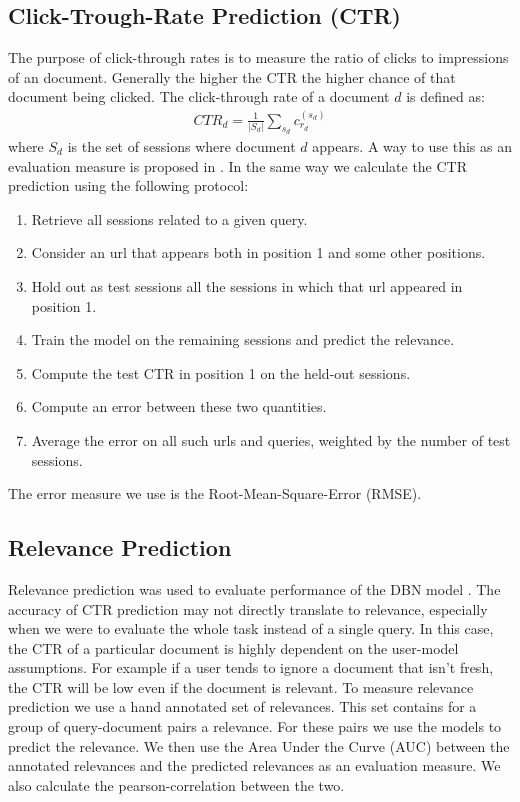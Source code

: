 \subsection{Click-Trough-Rate Prediction (CTR)}
\label{sec:ctr}
The purpose of click-through rates is to measure the ratio of clicks to impressions of an document.
Generally the higher the CTR the higher chance of that document being clicked.
The click-through rate of a document $d$ is defined as:
\begin{align}
	CTR_d = \frac{1}{|S_d|} \sum_{s_d} c_{r_d}^{(s_d)}
\end{align}
where $S_d$ is the set of sessions where document $d$ appears.
A way to use this as an evaluation measure is proposed in \cite[p. 4]{Chapelle2009}. In the same way we calculate the CTR prediction using the following protocol:
\begin{enumerate}
	\item Retrieve all sessions related to a given query.
	\item Consider an url that appears both in position 1 and some other positions.
	\item Hold out as test sessions all the sessions in which that url appeared in position 1.
	\item Train the model on the remaining sessions and predict the relevance.
	\item Compute the test CTR in position 1 on the held-out sessions.
	\item Compute an error between these two quantities.
	\item Average the error on all such urls and queries, weighted by the number of test sessions.
\end{enumerate}

The error measure we use is the Root-Mean-Square-Error (RMSE).

\subsection{Relevance Prediction}
Relevance prediction was used to evaluate performance of the DBN model \cite[p. 6]{Chapelle2009}.
The accuracy of CTR prediction may not directly translate to relevance, especially when we were to evaluate the whole task instead of a single query.
In this case, the CTR of a particular document is highly dependent on the user-model assumptions.
For example if a user tends to ignore a document that isn't fresh, the CTR will be low even if the document is relevant.
To measure relevance prediction we use a hand annotated set of relevances. This set contains for a group of query-document pairs a relevance. For these pairs we use the models to predict the relevance. We then use the Area Under the Curve (AUC) between the annotated relevances and the predicted relevances as an evaluation measure. We also calculate the pearson-correlation between the two.

